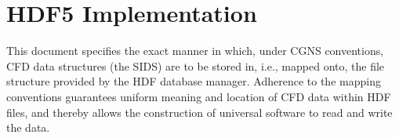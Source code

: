 \section{HDF5 Implementation}
\label{s:hdf5}
\thispagestyle{plain}

This document specifies the exact manner in which, under CGNS
conventions, CFD data structures (the SIDS) are to be stored in, i.e.,
mapped onto, the file structure provided by the HDF database manager.
Adherence to the mapping conventions guarantees uniform meaning
and location of CFD data within HDF files, and thereby allows the
construction of universal software to read and write the data.


